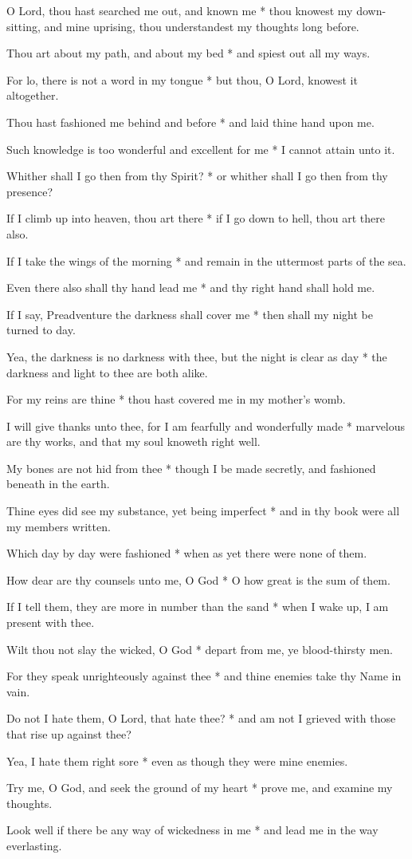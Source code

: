 O Lord, thou hast searched me out, and known me * thou knowest my down-sitting, and mine uprising, thou understandest my thoughts long before.

Thou art about my path, and about my bed * and spiest out all my ways.

For lo, there is not a word in my tongue * but thou, O Lord, knowest it altogether.

Thou hast fashioned me behind and before * and laid thine hand upon me.

Such knowledge is too wonderful and excellent for me * I cannot attain unto it.

Whither shall I go then from thy Spirit? * or whither shall I go then from thy presence?

If I climb up into heaven, thou art there * if I go down to hell, thou art there also.

If I take the wings of the morning * and remain in the uttermost parts of the sea.

Even there also shall thy hand lead me * and thy right hand shall hold me.

If I say, Preadventure the darkness shall cover me * then shall my night be turned to day.

Yea, the darkness is no darkness with thee, but the night is clear as day * the darkness and light to thee are both alike.

For my reins are thine * thou hast covered me in my mother's womb.

I will give thanks unto thee, for I am fearfully and wonderfully made * marvelous are thy works, and that my soul knoweth right well.

My bones are not hid from thee * though I be made secretly, and fashioned beneath in the earth.

Thine eyes did see my substance, yet being imperfect * and in thy book were all my members written.

Which day by day were fashioned * when as yet there were none of them.

How dear are thy counsels unto me, O God * O how great is the sum of them.

If I tell them, they are more in number than the sand * when I wake up, I am present with thee.

Wilt thou not slay the wicked, O God * depart from me, ye blood-thirsty men.

For they speak unrighteously against thee * and thine enemies take thy Name in vain.

Do not I hate them, O Lord, that hate thee? * and am not I grieved with those that rise up against thee?

Yea, I hate them right sore * even as though they were mine enemies.

Try me, O God, and seek the ground of my heart * prove me, and examine my thoughts.

Look well if there be any way of wickedness in me * and lead me in the way everlasting.